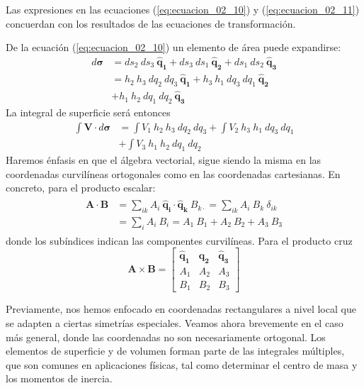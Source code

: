 Las expresiones en las ecuaciones (\ref{eq:ecuacion_02_10}) y (\ref{eq:ecuacion_02_11}) concuerdan con los resultados de las ecuaciones de transformación.
\par
De la ecuación (\ref{eq:ecuacion_02_10}) un elemento de área puede expandirse:
\begin{align*}
d \bm{\sigma} &= ds_{2} \: ds_{3} \: \mathbf{\widehat{q}_{1}} + ds_{3} \: ds_{1} \: \mathbf{\widehat{q}_{2}} + ds_{1} \: ds_{2} \: \mathbf{\widehat{q}_{3}} \\
&= h_{2} \: h_{3} \: d q_{2} \: d q_{3} \: \mathbf{\widehat{q}_{1}} + h_{3} \: h_{1} \: d q_{3} \: d q_{1} \: \mathbf{\widehat{q}_{2}} \\
&+ h_{1} \: h_{2} \: d q_{1} \: d q_{2} \: \mathbf{\widehat{q}_{3}}
\end{align*}
La integral de superficie será entonces
\begin{align*}
\int \mathbf{V} \cdot d \bm{\sigma} &= \int V_{1} \: h_{2} \: h_{3} \: d q_{2} \: d q_{3} + \int V_{2} \: h_{3} \: h_{1} \: d q_{3} \: d q_{1} \\
&+ \int V_{3} \: h_{1} \: h_{2} \: d q_{1} \: d q_{2}
\end{align*}
Haremos énfasis en que el álgebra vectorial, sigue siendo la misma en las coordenadas curvilíneas ortogonales como en las coordenadas cartesianas. En concreto, para el producto escalar:
\begin{align}
\begin{aligned}
\mathbf{A} \cdot \mathbf{B} &= \sum_{ik} A_{i} \: \mathbf{\widehat{q}_{i}} \cdot \mathbf{\widehat{q}_{k}} \: B_{k\cdot} = \sum_{ik} A_{i} \: B_{k} \: \delta_{ik} \\
&= \sum_{i} A_{i} \: B_{i} = A_{1} \: B_{1} + A_{2} \: B_{2} + A_{3} \: B_{3}
\end{aligned}
\label{eq:ecuacion_02_12}
\end{align}
donde los subíndices indican las componentes curvilíneas. Para el producto cruz
\begin{equation}
\mathbf{A} \times \mathbf{B} = \begin{bmatrix}
\mathbf{\widehat{q}_{1}} & \mathbf{\widehat{q}_{2}} & \mathbf{\widehat{q}_{3}} \\
A_{1} & A_{2} & A_{3} \\
B_{1} & B_{2} & B_{3}
\end{bmatrix}
\label{eq:ecuacion_02_13}
\end{equation}

Previamente, nos hemos enfocado en coordenadas rectangulares a nivel local que se adapten a ciertas simetrías especiales. Veamos ahora brevemente en el caso más general, donde las coordenadas no son necesariamente ortogonal. Los elementos de superficie y de volumen forman parte de las integrales múltiples, que son comunes en aplicaciones físicas, tal como determinar el centro de masa y los momentos de inercia.

